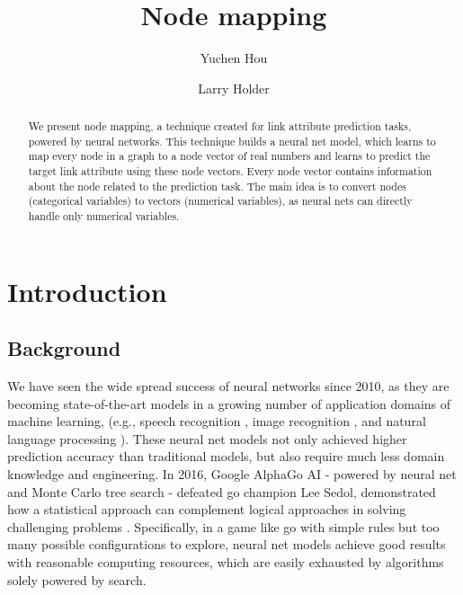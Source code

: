 \documentclass{article}
\begin{document}
\lstset{language=python, tabsize=4}
\title{Node mapping}
\author{Yuchen Hou \and Larry Holder}
\maketitle

\begin{abstract}
	We present node mapping, a technique created for link attribute prediction 
	tasks, powered by neural networks.
	This technique builds a neural net model, which learns to map every node in 
	a graph to a node vector of real numbers and learns to predict the target 
	link attribute using these node vectors.
	Every node vector contains information about the node related to the
	prediction task.
	The main idea is to convert nodes (categorical variables) to vectors 
	(numerical variables), as neural nets can directly handle only numerical 
	variables.
\end{abstract}

\section{Introduction}

\subsection{Background}
We have seen the wide spread success of neural networks since 2010, as they are 
becoming state-of-the-art models in a growing number of application domains of 
machine learning, (e.g., speech recognition \cite{hannun2014deep}, image 
recognition \cite{simonyan2014very}, and natural language 
processing \cite{yao2013recurrent}).
These neural net models not only achieved higher prediction accuracy than 
traditional models, but also require much less domain knowledge and engineering.
In 2016, Google AlphaGo AI - powered by neural net and Monte Carlo tree search 
- defeated go champion Lee Sedol, demonstrated how a statistical approach can 
complement logical approaches in solving challenging 
problems \cite{silver2016mastering}.
Specifically, in a game like go with simple rules but too many possible 
configurations to explore, neural net models achieve good results with 
reasonable computing resources, which are easily exhausted by algorithms solely 
powered by search.
\end{document}
